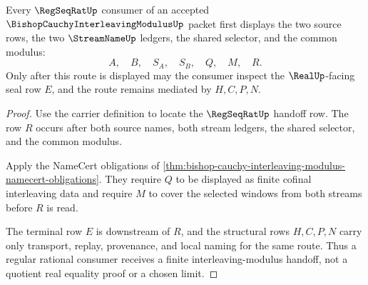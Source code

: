 \begin{theorem}
\label{thm:bishop-cauchy-interleaving-modulus-regseqrat-handoff}
Every $\RegSeqRatUp$ consumer of an accepted $\BishopCauchyInterleavingModulusUp$ packet first displays the two source rows, the two $\StreamNameUp$ ledgers, the shared selector, and the common modulus:
$$
A,\quad B,\quad S_A,\quad S_B,\quad Q,\quad M,\quad R.
$$
Only after this route is displayed may the consumer inspect the $\RealUp$-facing seal row $E$, and the route remains mediated by $H,C,P,N$.
\end{theorem}
\begin{proof}
Use the carrier definition to locate the $\RegSeqRatUp$ handoff row. The row $R$ occurs after both source names, both stream ledgers, the shared selector, and the common modulus.

Apply the NameCert obligations of \autoref{thm:bishop-cauchy-interleaving-modulus-namecert-obligations}. They require $Q$ to be displayed as finite cofinal interleaving data and require $M$ to cover the selected windows from both streams before $R$ is read.

The terminal row $E$ is downstream of $R$, and the structural rows $H,C,P,N$ carry only transport, replay, provenance, and local naming for the same route. Thus a regular rational consumer receives a finite interleaving-modulus handoff, not a quotient real equality proof or a chosen limit.
\end{proof}


\begin{closurestatus}{\BishopCauchyInterleavingModulusUp}
  \theoryclosure{\seedClosure}
  \formalstatus{\unformalizedV}
\end{closurestatus}
